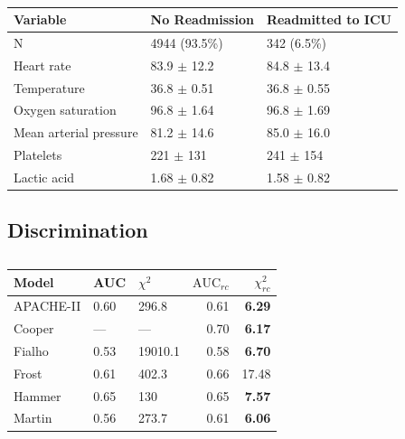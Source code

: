 \documentclass[onecolumn]{article}
\begin{document}
\begin{table}[hb]
\centering
	\renewcommand{\arraystretch}{1.4}
		\caption{}%
	\begin{tabular}{lp{2.5cm}p{2cm}}
		\hline
		Variable & No Readmission & Readmitted to ICU\\
		\hline
		N & 4944 (93.5\%)  &      342 (6.5\%)\\
		Heart rate & 83.9 $\pm$ 12.2 & 84.8 $\pm$ 13.4\\
		Temperature & 36.8 $\pm$ 0.51 &  36.8 $\pm$ 0.55\\
		Oxygen saturation & 96.8 $\pm$ 1.64 & 96.8 $\pm$ 1.69\\
		Mean arterial pressure & 81.2 $\pm$ 14.6 & 85.0 $\pm$ 16.0\\
		Platelets & 221 $\pm$ 131 & 241 $\pm$ 154\\
		Lactic acid & 1.68 $\pm$ 0.82 & 1.58 $\pm$ 0.82\\
		\hline
	\end{tabular}
	\label{Table1Fialho}
\end{table}


\subsection{Discrimination}


\begin{table}[hb]
\centering
	\renewcommand{\arraystretch}{1.4}
		\caption{}%
		\begin{tabular}{lllrr}
		\hline
		Model & AUC & $ \chi^{2} $ & $ \mathrm{AUC}_{rc} $ & $ \chi^{2}_{rc} $\\
		\hline
		APACHE-II & 0.60 & 296.8 & 0.61 & \textbf{6.29}\\
		Cooper & --- & --- & 0.70 & \textbf{6.17}\\
		Fialho & 0.53 & 19010.1 & 0.58 & \textbf{6.70}\\
		Frost & 0.61 & 402.3 & 0.66 & 17.48\\
		Hammer & 0.65 & 130 & 0.65 & \textbf{7.57}\\
		Martin & 0.56 & 273.7 & 0.61 & \textbf{6.06}\\
		\hline
		\end{tabular}
	\label{ModelComparisonTable}
\end{table}
\end{document}
